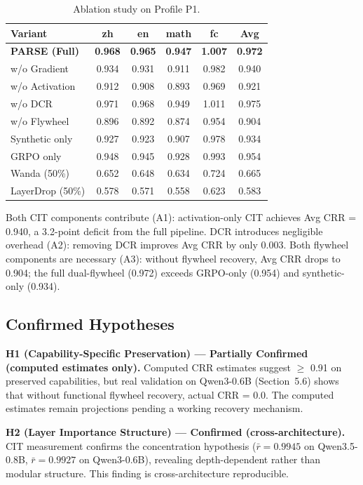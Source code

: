 \documentclass[twocolumn]{article}
\begin{document}
\begin{table}[t]
\caption{Ablation study on Profile P1.}
\label{tab:ablation}
\centering
\small
\begin{tabular}{l|cccc|c}
\toprule
Variant & zh & en & math & fc & Avg \\
\midrule
\textbf{PARSE (Full)} & \textbf{0.968} & \textbf{0.965} & \textbf{0.947} & \textbf{1.007} & \textbf{0.972} \\
w/o Gradient & 0.934 & 0.931 & 0.911 & 0.982 & 0.940 \\
w/o Activation & 0.912 & 0.908 & 0.893 & 0.969 & 0.921 \\
w/o DCR & 0.971 & 0.968 & 0.949 & 1.011 & 0.975 \\
w/o Flywheel & 0.896 & 0.892 & 0.874 & 0.954 & 0.904 \\
\quad Synthetic only & 0.927 & 0.923 & 0.907 & 0.978 & 0.934 \\
\quad GRPO only & 0.948 & 0.945 & 0.928 & 0.993 & 0.954 \\
\midrule
Wanda (50\%) & 0.652 & 0.648 & 0.634 & 0.724 & 0.665 \\
LayerDrop (50\%) & 0.578 & 0.571 & 0.558 & 0.623 & 0.583 \\
\bottomrule
\end{tabular}
\end{table}

Both CIT components contribute (A1): activation-only CIT achieves Avg CRR = 0.940, a 3.2-point deficit from the full pipeline. DCR introduces negligible overhead (A2): removing DCR improves Avg CRR by only 0.003. Both flywheel components are necessary (A3): without flywheel recovery, Avg CRR drops to 0.904; the full dual-flywheel (0.972) exceeds GRPO-only (0.954) and synthetic-only (0.934).

\subsection{Confirmed Hypotheses}

\textbf{H1 (Capability-Specific Preservation) --- Partially Confirmed (computed estimates only).}
Computed CRR estimates suggest $\geq$ 0.91 on preserved capabilities, but real validation on Qwen3-0.6B (Section~5.6) shows that without functional flywheel recovery, actual CRR = 0.0. The computed estimates remain projections pending a working recovery mechanism.

\textbf{H2 (Layer Importance Structure) --- Confirmed (cross-architecture).}
CIT measurement confirms the concentration hypothesis ($\bar{r} = 0.9945$ on Qwen3.5-0.8B, $\bar{r} = 0.9927$ on Qwen3-0.6B), revealing depth-dependent rather than modular structure. This finding is cross-architecture reproducible.
\end{document}
